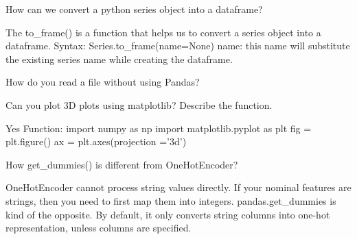 	\begin{qanda}
		\begin{question}
How can we convert a python series object into a dataframe?
		\end{question}
		\begin{answer}
The to\_frame() is a function that helps us to convert a series object into a dataframe. Syntax: Series.to\_frame(name=None) name: this name will substitute the existing series name while creating the dataframe.
		\end{answer}
	\end{qanda}

	\begin{qanda}
		\begin{question}
How do you read a file without using Pandas?
		\end{question}
		\begin{answer}

		\end{answer}
	\end{qanda}

	\begin{qanda}
		\begin{question}
 Can you plot 3D plots using matplotlib? Describe the function.
		\end{question}
		\begin{answer}
Yes Function: import numpy as np import matplotlib.pyplot as plt fig = plt.figure() ax = plt.axes(projection ='3d')
		\end{answer}
	\end{qanda}

	\begin{qanda}
		\begin{question}
How get\_dummies() is different from OneHotEncoder?
		\end{question}
		\begin{answer}
OneHotEncoder cannot process string values directly.  If your nominal features are strings, then you need to first map them into integers.  pandas.get\_dummies is kind of the opposite.  By default, it only converts string columns into one-hot representation, unless columns are specified.
		\end{answer}
	\end{qanda}

